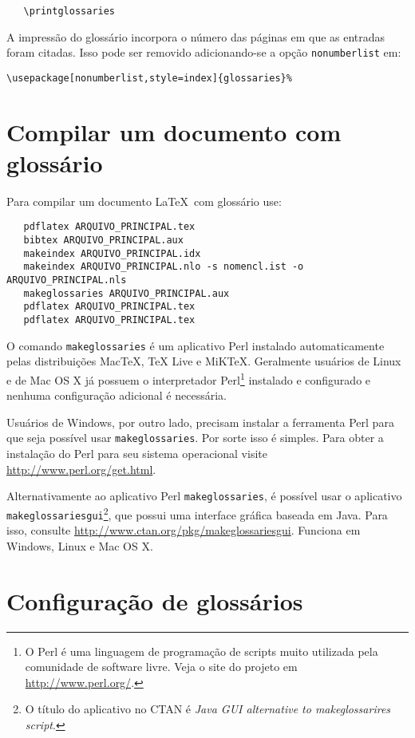 \documentclass[12pt,openright,twoside,a4paper]{abntex2}
\begin{document}
\begin{verbatim}
   \printglossaries
\end{verbatim}

A impressão do glossário incorpora o número das páginas em que as entradas foram
citadas. Isso pode ser removido adicionando-se a opção \texttt{nonumberlist} em:

\begin{verbatim}
\usepackage[nonumberlist,style=index]{glossaries}%
\end{verbatim}

\section{Compilar um documento com glossário}
 
Para compilar um documento \LaTeX\ com glossário use:

\begin{verbatim}
   pdflatex ARQUIVO_PRINCIPAL.tex
   bibtex ARQUIVO_PRINCIPAL.aux
   makeindex ARQUIVO_PRINCIPAL.idx 
   makeindex ARQUIVO_PRINCIPAL.nlo -s nomencl.ist -o ARQUIVO_PRINCIPAL.nls
   makeglossaries ARQUIVO_PRINCIPAL.aux
   pdflatex ARQUIVO_PRINCIPAL.tex
   pdflatex ARQUIVO_PRINCIPAL.tex
\end{verbatim}
 
O comando \texttt{makeglossaries} é um aplicativo Perl instalado
automaticamente pelas distribuições MacTeX, TeX Live e MiKTeX. Geralmente
usuários de Linux e de Mac OS X já possuem o interpretador Perl\footnote{O Perl
é uma linguagem de programação de scripts muito utilizada pela comunidade de
software livre. Veja o site do projeto em \url{http://www.perl.org/}.} instalado
e configurado e nenhuma configuração adicional é necessária.

Usuários de Windows, por outro lado, precisam instalar a ferramenta Perl para
que seja possível usar \texttt{makeglossaries}. Por sorte isso é simples. Para
obter a instalação do Perl para seu sistema operacional visite \url{http://www.perl.org/get.html}.

Alternativamente ao aplicativo Perl \texttt{makeglossaries}, é possível usar o
aplicativo \texttt{makeglossariesgui}\footnote{O título do aplicativo no CTAN
é \textit{Java GUI alternative to makeglossarires script}.}, que possui uma
interface gráfica baseada em Java. Para isso, consulte
\url{http://www.ctan.org/pkg/makeglossariesgui}. Funciona em Windows,
Linux e Mac OS X.

\section{Configuração de glossários}
\end{document}
